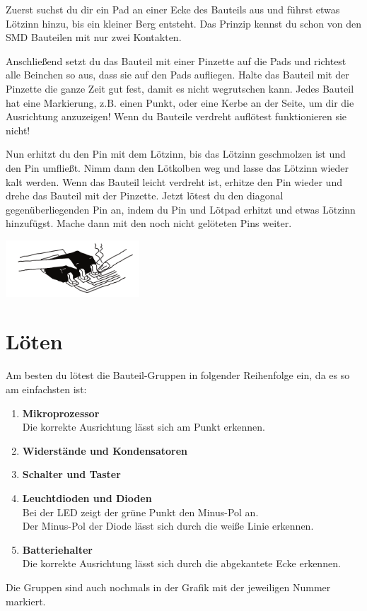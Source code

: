\documentclass{article} %
\begin{document}
Zuerst suchst du dir ein Pad an einer Ecke des Bauteils aus und führst
etwas Lötzinn hinzu, bis ein kleiner Berg entsteht. Das Prinzip kennst du
schon von den SMD Bauteilen mit nur zwei Kontakten.

Anschließend setzt du das Bauteil mit einer Pinzette auf die Pads und
richtest alle Beinchen so aus, dass sie auf den Pads aufliegen. Halte
das Bauteil mit der Pinzette die ganze Zeit gut fest, damit es nicht
wegrutschen kann. Jedes Bauteil hat eine Markierung, z.B. einen Punkt,
oder eine Kerbe an der Seite, um dir die Ausrichtung anzuzeigen!
Wenn du Bauteile verdreht auflötest funktionieren sie nicht!

Nun erhitzt du den Pin mit dem Lötzinn, bis das Lötzinn geschmolzen
ist und den Pin umfließt. Nimm dann den Lötkolben weg und lasse das
Lötzinn wieder kalt werden. Wenn das Bauteil leicht verdreht ist, erhitze
den Pin wieder und drehe das Bauteil mit der Pinzette.
Jetzt lötest du den diagonal gegenüberliegenden Pin an, indem du Pin
und Lötpad erhitzt und etwas Lötzinn hinzufügst. Mache dann mit den
noch nicht gelöteten Pins weiter.
\begin{center}
	\includegraphics[width=5cm]{-016}
\end{center}

\newpage
\section{Löten}
Am besten du lötest die Bauteil-Gruppen in folgender Reihenfolge ein, da es so am einfachsten ist:
\begin{enumerate}
	\item \textbf{Mikroprozessor}\\
	Die korrekte Ausrichtung lässt sich am Punkt erkennen.
	\item \textbf{Widerstände und Kondensatoren}
	\item \textbf{Schalter und Taster}
	\item \textbf{Leuchtdioden und Dioden}\\
	Bei der LED zeigt der grüne Punkt den Minus-Pol an.\\
	Der Minus-Pol der Diode lässt sich durch die weiße Linie erkennen.
	\item \textbf{Batteriehalter}\\
	Die korrekte Ausrichtung lässt sich durch die abgekantete Ecke erkennen.
\end{enumerate}
Die Gruppen sind auch nochmals in der Grafik mit der jeweiligen Nummer markiert.
\end{document}
